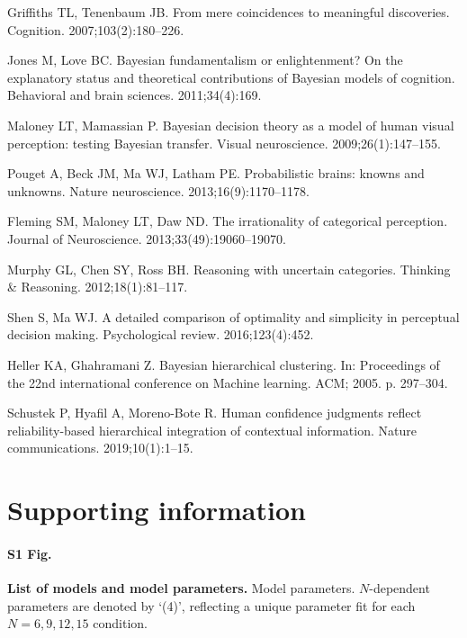 \documentclass{article}
\begin{document}
\begin{thebibliography}{10}
Griffiths TL, Tenenbaum JB.
\newblock From mere coincidences to meaningful discoveries.
\newblock Cognition. 2007;103(2):180--226.

Jones M, Love BC.
\newblock Bayesian fundamentalism or enlightenment? On the explanatory status
  and theoretical contributions of Bayesian models of cognition.
\newblock Behavioral and brain sciences. 2011;34(4):169.

Maloney LT, Mamassian P.
\newblock Bayesian decision theory as a model of human visual perception:
  testing Bayesian transfer.
\newblock Visual neuroscience. 2009;26(1):147--155.

Pouget A, Beck JM, Ma WJ, Latham PE.
\newblock Probabilistic brains: knowns and unknowns.
\newblock Nature neuroscience. 2013;16(9):1170--1178.

Fleming SM, Maloney LT, Daw ND.
\newblock The irrationality of categorical perception.
\newblock Journal of Neuroscience. 2013;33(49):19060--19070.

Murphy GL, Chen SY, Ross BH.
\newblock Reasoning with uncertain categories.
\newblock Thinking \& Reasoning. 2012;18(1):81--117.

Shen S, Ma WJ.
\newblock A detailed comparison of optimality and simplicity in perceptual
  decision making.
\newblock Psychological review. 2016;123(4):452.

Heller KA, Ghahramani Z.
\newblock Bayesian hierarchical clustering.
\newblock In: Proceedings of the 22nd international conference on Machine
  learning. ACM; 2005. p. 297--304.

Schustek P, Hyafil A, Moreno-Bote R.
\newblock Human confidence judgments reflect reliability-based hierarchical
  integration of contextual information.
\newblock Nature communications. 2019;10(1):1--15.

\end{thebibliography}

\section*{Supporting information}

\paragraph*{S1 Fig.}
\label{S1_Fig}
{\bf List of models and model parameters. }Model parameters. $N$-dependent parameters are denoted by `(4)', reflecting a unique parameter fit for each $N = 6, 9, 12, 15$ condition.
\end{document}
